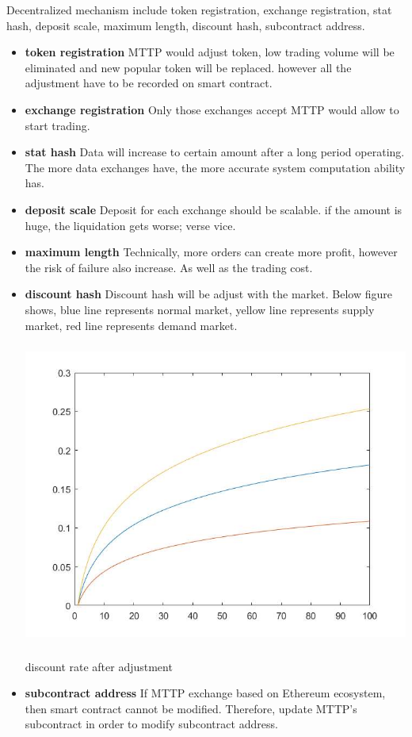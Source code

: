 \documentclass[UTF8,nofonts]{article}
\makeatletter
\newenvironment{figurehere}
 {\def\@captype{figure}}
 {}
\makeatother
\begin{document}
Decentralized mechanism include token registration, exchange registration, stat hash, deposit scale, maximum length, discount hash, subcontract address.
 \begin{itemize}
   \item \textbf{token registration} MTTP would adjust token,  low trading volume will be eliminated and new popular token will be replaced. however all the adjustment have to be recorded on smart contract.
  \item \textbf{exchange registration} Only those exchanges accept MTTP would allow to start trading.
   \item \textbf{stat hash} Data will increase to certain amount after a long period operating. The more data exchanges have,  the more accurate system computation ability has.
  \item \textbf{deposit scale} Deposit for each exchange should be scalable. if the amount is huge,  the liquidation gets worse; verse vice.
   \item \textbf{maximum length} Technically, more orders can create more profit,  however the risk of failure also increase. As well as the trading cost.
   \item \textbf{discount hash} Discount hash will be adjust with the market. Below figure shows, blue line represents normal market, yellow line represents supply market, red line represents demand market.
\begin{center}
\begin{figurehere}
\includegraphics[height=10cm]{images/rate_adjust.jpg}
\caption{discount rate after adjustment}
\label{fig: dischargeRateAdjust}
\end{figurehere}
\end{center}

   \item \textbf{subcontract address} If MTTP exchange based on Ethereum ecosystem,  then smart contract cannot be modified. Therefore,  update MTTP's subcontract in order to modify subcontract address.
 \end{itemize}
\end{document}
